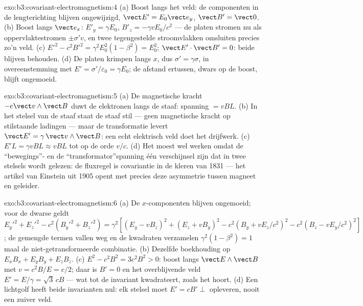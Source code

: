 \begin{solution}{exo:b3:covariant-electromagnetism:4}
(a) Boost langs het veld: de componenten in de lengterichting blijven
ongewijzigd, $\vect
E' = E_0\vect e_y$, $\vect B' = \vect 0$. (b) Boost
langs $\vect
e_x$: $E'_y = \gamma E_0$, $B'_z = -\gamma vE_0/c^2$ --- de
platen stromen nu als oppervlaktestromen $\pm\sigma'v$, en twee
tegengestelde stroomvlakken omsluiten precies zo'n veld. (c) $E'^2 - c^2B'^2 =
\gamma^2E_0^2(1 - \beta^2) = E_0^2$; $\vect E'\cdot\vect B' = 0$: beide blijven behouden. (d) De platen krimpen langs $x$, dus $\sigma' =
\gamma\sigma$, in overeenstemming met $E' = \sigma'/\varepsilon_0 = \gamma
E_0$; de afstand ertussen, dwars op de boost, blijft ongemoeid.
\end{solution}

\begin{solution}{exo:b3:covariant-electromagnetism:5}
(a) De magnetische kracht $-e\vect v\wedge\vect B$ duwt de elektronen
langs de staaf: spanning $= vBL$. (b) In het stelsel van de staaf
staat de staaf stil --- geen magnetische kracht op stilstaande ladingen
--- maar de transformatie levert $\vect E' = \gamma\,\vect v\wedge\vect B$: een echt elektrisch veld doet het drijfwerk. (c) $E'L = \gamma vBL
\approx vBL$ tot op de orde $v/c$. (d) Het moest wel werken omdat de
``bewegings''- en de ``transformator''spanning één verschijnsel zijn dat
in twee stelsels wordt gelezen: de fluxregel is covariantie in de kleren
van 1831 --- het artikel van Einstein uit 1905 opent met precies deze
asymmetrie tussen magneet en geleider.
\end{solution}

\begin{solution}{exo:b3:covariant-electromagnetism:6}
(a) De $x$-componenten blijven ongemoeid; voor de dwarse geldt
$E_y'^2 + E_z'^2 - c^2(B_y'^2 + B_z'^2) = \gamma^2[(E_y - vB_z)^2 +
(E_z + vB_y)^2 - c^2(B_y + vE_z/c^2)^2 - c^2(B_z - vE_y/c^2)^2]$;
de gemengde termen vallen weg en de kwadraten verzamelen $\gamma^2(1 -
\beta^2) = 1$ maal de niet-getransformeerde combinatie. (b) Dezelfde
boekhouding op $E_xB_x + E_yB_y + E_zB_z$. (c) $E^2 - c^2B^2 =
3c^2B^2 > 0$: boost langs $\vect E\wedge\vect B$ met $v = c^2B/E =
c/2$; daar is $B' = 0$ en het overblijvende veld $E' = E/\gamma =
\sqrt3\,cB$ --- wat tot de invariant kwadrateert, zoals het hoort. (d) Een lichtgolf heeft beide invarianten
nul: elk stelsel moet $E' = cB' \perp$ opleveren, nooit een zuiver veld.
\end{solution}


